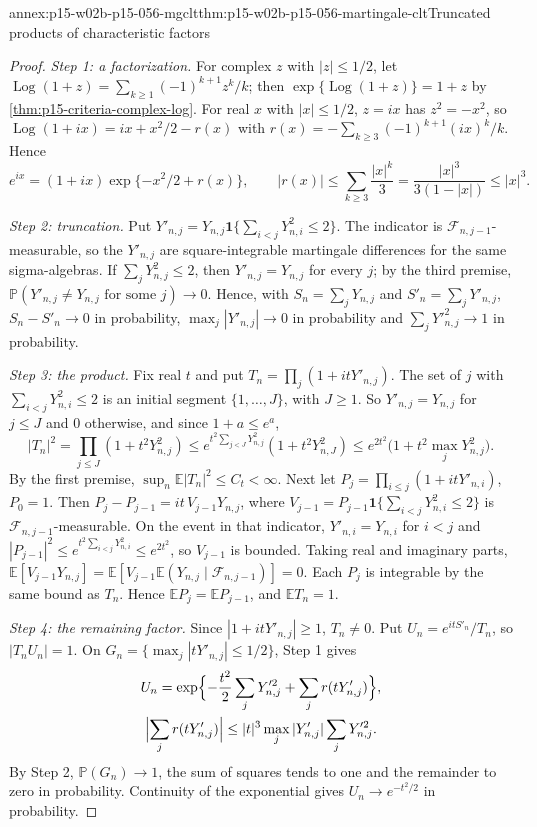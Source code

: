 \begin{annexitem}{annex:p15-w02b-p15-056-mgclt}{thm:p15-w02b-p15-056-martingale-clt}{Truncated products of characteristic factors}
\begin{proof}
\emph{Step 1: a factorization.} For complex \(z\) with \(|z|\leq1/2\), let
\(\operatorname{Log}(1+z)=\sum_{k\geq1}(-1)^{k+1}z^k/k\); then
\(\exp\{\operatorname{Log}(1+z)\}=1+z\) by
\cref{thm:p15-criteria-complex-log}. For real \(x\) with
\(|x|\leq1/2\), \(z=ix\) has \(z^2=-x^2\), so
\(\operatorname{Log}(1+ix)=ix+x^2/2-r(x)\) with
\(r(x)=-\sum_{k\geq3}(-1)^{k+1}(ix)^k/k\). Hence
\[
 e^{ix}=(1+ix)\exp\{-x^2/2+r(x)\},\qquad
 |r(x)|\leq\sum_{k\geq3}\frac{|x|^k}3=\frac{|x|^3}{3(1-|x|)}\leq|x|^3 .
\]

\emph{Step 2: truncation.} Put
\(Y'_{n,j}=Y_{n,j}\mathbf 1\{\sum_{i<j}Y_{n,i}^2\leq2\}\). The indicator is
\(\mathcal F_{n,j-1}\)-measurable, so the \(Y'_{n,j}\) are square-integrable
martingale differences for the same sigma-algebras. If
\(\sum_jY_{n,j}^2\leq2\), then \(Y'_{n,j}=Y_{n,j}\) for every \(j\); by the
third premise, \(\mathbb P(Y'_{n,j}\neq Y_{n,j}\text{ for some }j)\to0\).
Hence, with \(S_n=\sum_jY_{n,j}\) and \(S'_n=\sum_jY'_{n,j}\),
\(S_n-S'_n\to0\) in probability, \(\max_j|Y'_{n,j}|\to0\) in probability
and \(\sum_jY'^2_{n,j}\to1\) in probability.

\emph{Step 3: the product.} Fix real \(t\) and put
\(T_n=\prod_j(1+itY'_{n,j})\). The set of \(j\) with
\(\sum_{i<j}Y_{n,i}^2\leq2\) is an initial segment \(\{1,\ldots,J\}\),
with \(J\geq1\). So \(Y'_{n,j}=Y_{n,j}\) for \(j\leq J\) and \(0\)
otherwise, and since \(1+a\leq e^a\),
\[
 |T_n|^2=\prod_{j\leq J}(1+t^2Y_{n,j}^2)
 \leq e^{t^2\sum_{j<J}Y_{n,j}^2}(1+t^2Y_{n,J}^2)
 \leq e^{2t^2}\bigl(1+t^2\max_jY_{n,j}^2\bigr).
\]
By the first premise, \(\sup_n\mathbb E|T_n|^2\leq C_t<\infty\). Next let
\(P_j=\prod_{i\leq j}(1+itY'_{n,i})\), \(P_0=1\). Then
\(P_j-P_{j-1}=it\,V_{j-1}Y_{n,j}\), where
\(V_{j-1}=P_{j-1}\mathbf 1\{\sum_{i<j}Y_{n,i}^2\leq2\}\) is
\(\mathcal F_{n,j-1}\)-measurable. On the event in that indicator,
\(Y'_{n,i}=Y_{n,i}\) for \(i<j\) and
\(|P_{j-1}|^2\leq e^{t^2\sum_{i<j}Y_{n,i}^2}\leq e^{2t^2}\), so
\(V_{j-1}\) is bounded. Taking real and imaginary parts,
\(\mathbb E[V_{j-1}Y_{n,j}]=\mathbb E[V_{j-1}\mathbb E(Y_{n,j}\mid\mathcal F_{n,j-1})]=0\).
Each \(P_j\) is integrable by the same bound as \(T_n\). Hence
\(\mathbb EP_j=\mathbb EP_{j-1}\), and \(\mathbb ET_n=1\).

\emph{Step 4: the remaining factor.} Since \(|1+itY'_{n,j}|\geq1\),
\(T_n\neq0\). Put \(U_n=e^{itS'_n}/T_n\), so \(|T_nU_n|=1\). On
\(G_n=\{\max_j|tY'_{n,j}|\leq1/2\}\), Step 1 gives
\[
\begin{gathered}
 U_n=\exp\Bigl\{-\frac{t^2}2\sum_jY'^2_{n,j}+\sum_jr(tY'_{n,j})\Bigr\},\\
 \Bigl|\sum_jr(tY'_{n,j})\Bigr|\leq|t|^3\max_j|Y'_{n,j}|\sum_jY'^2_{n,j}.
\end{gathered}
\]
By Step 2, \(\mathbb P(G_n)\to1\), the sum of squares tends to one and the
remainder to zero in probability. Continuity of the exponential gives
\(U_n\to e^{-t^2/2}\) in probability.


\end{proof}
\end{annexitem}
